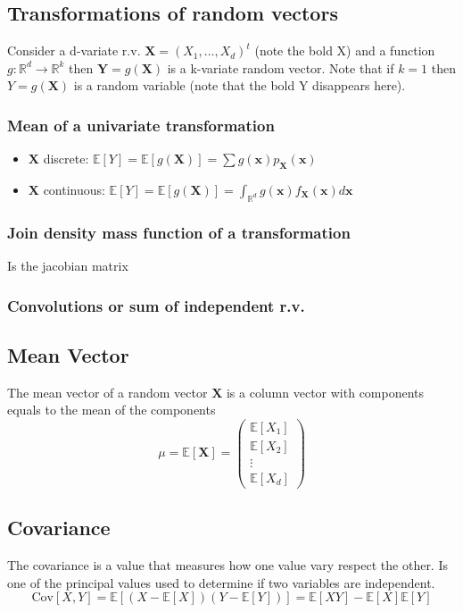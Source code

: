 \subsection{Transformations of random vectors}
Consider a d-variate r.v. $\textbf{X}=(X_1,\dots,X_d)^t$ (note the bold X) and a function
$g:\mathbb{R}^d \rightarrow \mathbb{R}^k$ then $\textbf{Y}=g(\textbf{X})$ is a k-variate 
random vector. Note that if $k=1$ then $Y=g(\textbf{X})$ is a random variable (note that
the bold Y disappears here).
\subsubsection{Mean of a univariate transformation}
\begin{itemize}
    \item $\textbf{X}$ discrete: $\mathbb{E}[Y]=\mathbb{E}[g(\textbf{X})]=\sum g(\textbf{x})p_\textbf{X}(\textbf{x})$
    \item $\textbf{X}$ continuous: $\mathbb{E}[Y]=\mathbb{E}[g(\textbf{X})]=\int_{\mathbb{R}^d} g(\textbf{x})f_\textbf{X}(\textbf{x})d\textbf{x}$
\end{itemize}
\subsubsection{Join density mass function of a transformation}
Is the jacobian matrix

\subsubsection{Convolutions or sum of independent r.v.}

\subsection{Mean Vector}
The mean vector of a random vector $\textbf{X}$ is a column vector with components 
equals to the mean of the components
\[ \mu = \mathbb{E}[\textbf{X}] = 
\begin{pmatrix}
    \mathbb{E}[X_1]\\\mathbb{E}[X_2]\\\vdots\\\mathbb{E}[X_d]
\end{pmatrix}
\]

\subsection{Covariance}
The covariance is a value that measures how one value vary respect the other. Is 
one of the principal values used to determine if two variables are independent.
\[ \text{Cov}[X,Y] = \mathbb{E}[(X-\mathbb{E}[X])(Y-\mathbb{E}[Y])] =
\mathbb{E}[XY]-\mathbb{E}[X]\mathbb{E}[Y] \]

